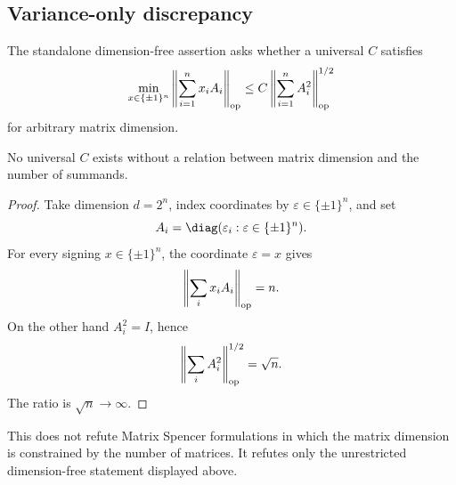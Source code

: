 \subsection{Variance-only discrepancy}

The standalone dimension-free assertion asks whether a universal $C$ satisfies
\[
\min_{x\in\{\pm1\}^n}\left\|\sum_{i=1}^n x_iA_i\right\|_{\rm op}
\le C\left\|\sum_{i=1}^nA_i^2\right\|_{\rm op}^{1/2}
\]
for arbitrary matrix dimension.

\begin{theorem}\label{thm:discrepancy}
No universal $C$ exists without a relation between matrix dimension and the number of summands.
\end{theorem}
\begin{proof}
Take dimension $d=2^n$, index coordinates by $\varepsilon\in\{\pm1\}^n$, and set
\[
A_i=\diag(\varepsilon_i:\varepsilon\in\{\pm1\}^n).
\]
For every signing $x\in\{\pm1\}^n$, the coordinate $\varepsilon=x$ gives
\[
\left\|\sum_i x_iA_i\right\|_{\rm op}=n.
\]
On the other hand $A_i^2=I$, hence
\[
\left\|\sum_iA_i^2\right\|_{\rm op}^{1/2}=\sqrt n.
\]
The ratio is $\sqrt n\to\infty$.
\end{proof}

\begin{remark}[Scope]
This does not refute Matrix Spencer formulations in which the matrix dimension is constrained by the number of matrices.  It refutes only the unrestricted dimension-free statement displayed above.
\end{remark}
